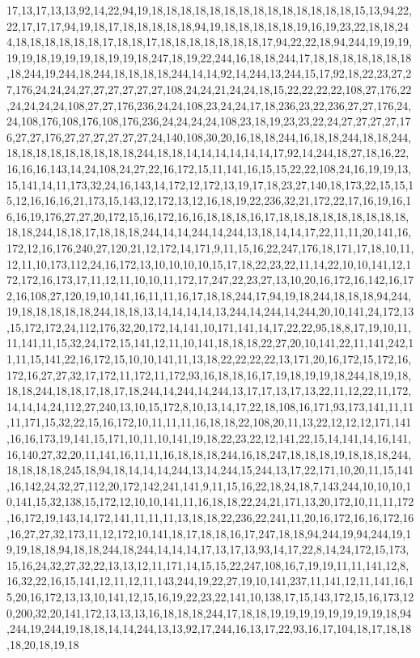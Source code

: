 17,13,17,13,13,92,14,22,94,19,18,18,18,18,18,18,18,18,18,18,18,18,18,18,15,13,94,22,22,17,17,17,94,19,18,17,18,18,18,18,18,94,19,18,18,18,18,18,19,16,19,23,22,18,18,244,18,18,18,18,18,18,17,18,18,17,18,18,18,18,18,18,18,17,94,22,22,18,94,244,19,19,19,19,19,18,19,19,19,18,19,19,18,247,18,19,22,244,16,18,18,244,17,18,18,18,18,18,18,18,18,244,19,244,18,244,18,18,18,18,244,14,14,92,14,244,13,244,15,17,92,18,22,23,27,27,176,24,24,24,27,27,27,27,27,27,108,24,24,21,24,24,18,15,22,22,22,22,108,27,176,22,24,24,24,24,108,27,27,176,236,24,24,108,23,24,24,17,18,236,23,22,236,27,27,176,24,24,108,176,108,176,108,176,236,24,24,24,24,108,23,18,19,23,23,22,24,27,27,27,27,176,27,27,176,27,27,27,27,27,27,24,140,108,30,20,16,18,18,244,16,18,18,244,18,18,244,18,18,18,18,18,18,18,18,18,244,18,18,14,14,14,14,14,14,17,92,14,244,18,27,18,16,22,16,16,16,143,14,24,108,24,27,22,16,172,15,11,141,16,15,15,22,22,108,24,16,19,19,13,15,141,14,11,173,32,24,16,143,14,172,12,172,13,19,17,18,23,27,140,18,173,22,15,15,15,12,16,16,16,21,173,15,143,12,172,13,12,16,18,19,22,236,32,21,172,22,17,16,19,16,16,16,19,176,27,27,20,172,15,16,172,16,16,18,18,18,16,17,18,18,18,18,18,18,18,18,18,18,18,244,18,18,17,18,18,18,244,14,14,244,14,244,13,18,14,14,17,22,11,11,20,141,16,172,12,16,176,240,27,120,21,12,172,14,171,9,11,15,16,22,247,176,18,171,17,18,10,11,12,11,10,173,112,24,16,172,13,10,10,10,10,15,17,18,22,23,22,11,14,22,10,10,141,12,172,172,16,173,17,11,12,11,10,10,11,172,17,247,22,23,27,13,10,20,16,172,16,142,16,172,16,108,27,120,19,10,141,16,11,11,16,17,18,18,244,17,94,19,18,244,18,18,18,94,244,19,18,18,18,18,18,244,18,18,13,14,14,14,14,13,244,14,244,14,244,20,10,141,24,172,13,15,172,172,24,112,176,32,20,172,14,141,10,171,141,14,17,22,22,95,18,8,17,19,10,11,11,141,11,15,32,24,172,15,141,12,11,10,141,18,18,18,22,27,20,10,141,22,11,141,242,11,11,15,141,22,16,172,15,10,10,141,11,13,18,22,22,22,22,13,171,20,16,172,15,172,16,172,16,27,27,32,17,172,11,172,11,172,93,16,18,18,16,17,19,18,19,19,18,244,18,19,18,18,18,244,18,18,17,18,17,18,244,14,244,14,244,13,17,17,13,17,13,22,11,12,22,11,172,14,14,14,24,112,27,240,13,10,15,172,8,10,13,14,17,22,18,108,16,171,93,173,141,11,11,11,171,15,32,22,15,16,172,10,11,11,11,16,18,18,22,108,20,11,13,22,12,12,12,171,141,16,16,173,19,141,15,171,10,11,10,141,19,18,22,23,22,12,141,22,15,14,141,14,16,141,16,140,27,32,20,11,141,16,11,11,16,18,18,18,244,16,18,247,18,18,18,19,18,18,18,244,18,18,18,18,245,18,94,18,14,14,14,244,13,14,244,15,244,13,17,22,171,10,20,11,15,141,16,142,24,32,27,112,20,172,142,241,141,9,11,15,16,22,18,24,18,7,143,244,10,10,10,10,141,15,32,138,15,172,12,10,10,141,11,16,18,18,22,24,21,171,13,20,172,10,11,11,172,16,172,19,143,14,172,141,11,11,11,13,18,18,22,236,22,241,11,20,16,172,16,16,172,16,16,27,27,32,173,11,12,172,10,141,18,17,18,18,16,17,247,18,18,94,244,19,94,244,19,19,19,18,18,94,18,18,244,18,244,14,14,14,17,13,17,13,93,14,17,22,8,14,24,172,15,173,15,16,24,32,27,32,22,13,13,12,11,171,14,15,15,22,247,108,16,7,19,19,11,11,141,12,8,16,32,22,16,15,141,12,11,12,11,143,244,19,22,27,19,10,141,237,11,141,12,11,141,16,15,20,16,172,13,13,10,141,12,15,16,19,22,23,22,141,10,138,17,15,143,172,15,16,173,120,200,32,20,141,172,13,13,13,16,18,18,18,244,17,18,18,19,19,19,19,19,19,19,19,18,94,244,19,244,19,18,18,14,14,244,13,13,92,17,244,16,13,17,22,93,16,17,104,18,17,18,18,18,20,18,19,18